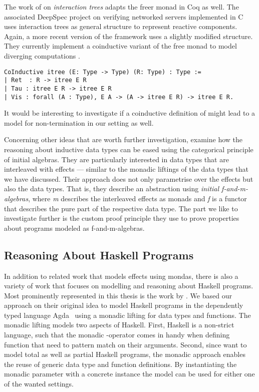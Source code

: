 The work of \citet{koh2019interaction} on \emph{interaction trees} adapts the freer monad in Coq as well.
The associated DeepSpec project on verifying networked servers implemented in C uses interaction trees as general structure to represent reactive components.
Again,  a more recent version of the framework uses a slightly modified structure.
They currently implement a coinductive variant of the free monad to model diverging computations \citep{xia2019interaction}.

\begin{verbatim}
CoInductive itree (E: Type -> Type) (R: Type) : Type :=
| Ret  : R -> itree E R
| Tau : itree E R -> itree E R
| Vis : forall (A : Type), E A -> (A -> itree E R) -> itree E R.
\end{verbatim}

It would be interesting to investigate if a coinductive definition of  might lead to a model for non-termination in our setting as well.

Concerning other ideas that are worth further investigation, \citet{atkey2015interleaving} examine how the reasoning about
inductive data types can be eased using the categorical principle of initial algebras.
They are particularly interested in data types that are interleaved with effects --- similar to the monadic liftings of the data types that we have discussed.
Their approach does not only parametrise over the effects but also the data types.
That is, they describe an abstraction using \emph{initial f-and-m-algebras}, where \emph{m} describes the interleaved effects as monads and \emph{f} is a functor that describes the pure part of the respective data type.
The part we like to investigate further is the custom proof principle they use to prove properties about programs modeled as f-and-m-algebras.


\subsection{Reasoning About Haskell Programs}

In addition to related work that models effects using mondas, there is also a variety of work that focuses on modelling and reasoning about Haskell programs.
Most prominently represented in this thesis is the work by \citet{abel2005verifying}.
We based our approach on their original idea to model Haskell programs in the dependently typed language Agda~\citep{norell2008dependently} using a monadic lifting for data types and functions.
The monadic lifting models two aspects of Haskell.
First, Haskell is a non-strict language, such that the monadic \hinl{>>=}-operator comes in handy when defining function that need to pattern match on their arguments.
Second, since \citeauthor{abel2005verifying} want to model total as well as partial Haskell programs, the monadic approach enables the reuse of generic data type and function definitions.
By instantiating the monadic parameter with a concrete instance the model can be used for either one of the wanted settings.

